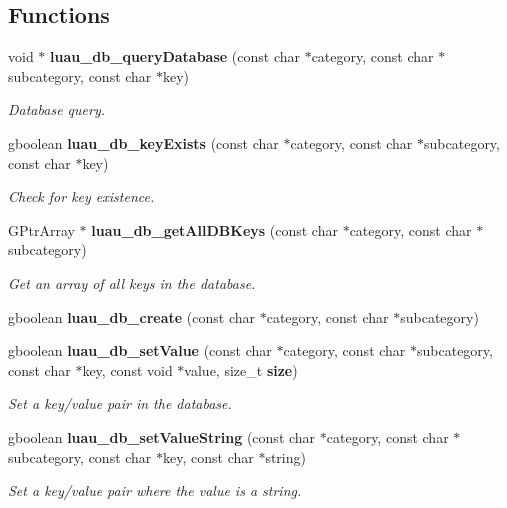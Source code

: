 \subsection*{Functions}
\begin{CompactItemize}
\item 
void $\ast$ {\bf luau\_\-db\_\-query\-Database} (const char $\ast$category, const char $\ast$subcategory, const char $\ast$key)
\begin{CompactList}\small\item\em Database query. \item\end{CompactList}\item 
gboolean {\bf luau\_\-db\_\-key\-Exists} (const char $\ast$category, const char $\ast$subcategory, const char $\ast$key)
\begin{CompactList}\small\item\em Check for key existence. \item\end{CompactList}\item 
GPtr\-Array $\ast$ {\bf luau\_\-db\_\-get\-All\-DBKeys} (const char $\ast$category, const char $\ast$subcategory)
\begin{CompactList}\small\item\em Get an array of all keys in the database. \item\end{CompactList}\item 
gboolean {\bf luau\_\-db\_\-create} (const char $\ast$category, const char $\ast$subcategory)
\item 
gboolean {\bf luau\_\-db\_\-set\-Value} (const char $\ast$category, const char $\ast$subcategory, const char $\ast$key, const void $\ast$value, size\_\-t {\bf size})
\begin{CompactList}\small\item\em Set a key/value pair in the database. \item\end{CompactList}\item 
gboolean {\bf luau\_\-db\_\-set\-Value\-String} (const char $\ast$category, const char $\ast$subcategory, const char $\ast$key, const char $\ast$string)
\begin{CompactList}\small\item\em Set a key/value pair where the value is a string. \item\end{CompactList}\item 

\end{CompactItemize}
